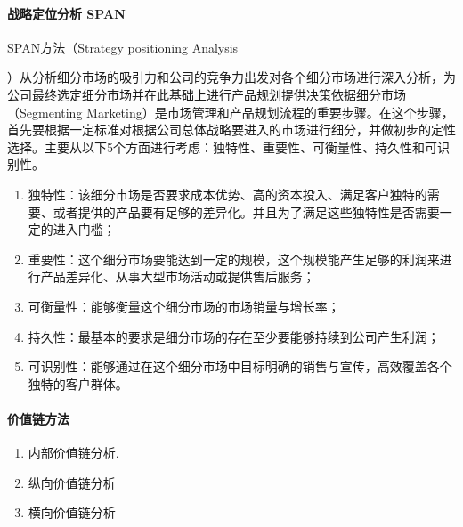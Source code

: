 \documentclass[letterpaper,11pt,english]{sphinxmanual}
\begin{document}
\paragraph{战略定位分析 SPAN}
\label{\detokenize{chapter_knowledge/BRD:span}}
SPAN方法（Strategy positioning
Analysis%
\begin{footnote}[424]\sphinxAtStartFootnote
{}
%
\end{footnote}）从分析细分市场的吸引力和公司的竞争力出发对各个细分市场进行深入分析，为公司最终选定细分市场并在此基础上进行产品规划提供决策依据细分市场（Segmenting
Marketing）是市场管理和产品规划流程的重要步骤。在这个步骤，首先要根据一定标准对根据公司总体战略要进入的市场进行细分，并做初步的定性选择。主要从以下5个方面进行考虑：独特性、重要性、可衡量性、持久性和可识别性。
\begin{enumerate}
%
\item {} 
独特性：该细分市场是否要求成本优势、高的资本投入、满足客户独特的需要、或者提供的产品要有足够的差异化。并且为了满足这些独特性是否需要一定的进入门槛；

\item {} 
重要性：这个细分市场要能达到一定的规模，这个规模能产生足够的利润来进行产品差异化、从事大型市场活动或提供售后服务；

\item {} 
可衡量性：能够衡量这个细分市场的市场销量与增长率；

\item {} 
持久性：最基本的要求是细分市场的存在至少要能够持续到公司产生利润；

\item {} 
可识别性：能够通过在这个细分市场中目标明确的销售与宣传，高效覆盖各个独特的客户群体。%
\begin{footnote}[425]\sphinxAtStartFootnote
{}
%
\end{footnote}

\end{enumerate}


\paragraph{价值链方法}
\label{\detokenize{chapter_knowledge/BRD:id17}}\begin{enumerate}
%
\item {} 
内部价值链分析.

\item {} 
纵向价值链分析

\item {} 
横向价值链分析

\end{enumerate}
\end{document}
